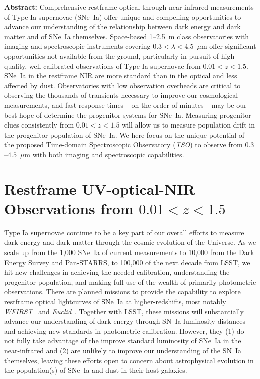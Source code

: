\documentclass[12pt,preprint]{aastex}
\newcommand{\snia}{SN~Ia\xspace}
\newcommand{\sneia}{SNe~Ia\xspace}
\begin{document}
\textbf{Abstract:}
    Comprehensive restframe optical through near-infrared measurements of Type Ia supernovae (\sneia) offer unique and compelling opportunities to advance our understanding of the relationship between dark energy and dark matter and of \sneia themselves.
    Space-based 1--2.5~m class observatories with imaging and spectroscopic instruments covering $0.3<\lambda<4.5$~$\mu$m offer significant opportunities not available from the ground, particularly in pursuit of high-quality, well-calibrated observations of Type Ia supernovae from $0.01<z<1.5$.
    \sneia in the restframe NIR are more standard than in the optical and less affected by dust.
    Observatories with low observation overheads are critical to observing the thousands of transients necessary to improve our cosmological measurements, and fast response times -- on the order of minutes -- may be our best hope of determine the progenitor systems for \sneia.
    Measuring progenitor clues consistently from $0.01<z<1.5$ will allow us to measure population drift in the progenitor population of \sneia.
    We here focus on the unique potential of the proposed Time-domain Spectroscopic Observatory ({\it TSO}) to observe from $0.3$--$4.5$~$\mu$m with both imaging and spectroscopic capabilities.


\pagebreak
\setcounter{page}{1}
\section{Restframe UV-optical-NIR Observations from $0.01<z<1.5$}

Type Ia supernovae continue to be a key part of our overall efforts to measure dark energy and dark matter through the cosmic evolution of the Universe.  As we scale up from the 1,000 \sneia of current measurements to 10,000 from the Dark Energy Survey and Pan-STARRS, to 100,000 of the next decade from LSST, we hit new challenges in achieving the needed calibration, understanding the progenitor population, and making full use of the wealth of primarily photometric observations.  There are planned missions to provide the capability to explore restframe optical lightcurves of \sneia at higher-redshifts, most notably {\it WFIRST}~\citep{Spergel15,Hounsell18} and {\it Euclid}~\citep{Astier14}.  Together with LSST, these missions will substantially advance our understanding of dark energy through \snia luminosity distances and achieving new standards in photometric calibration.  However, they (1) do not fully take advantage of the improve standard luminosity of \sneia in the near-infrared and (2) are unlikely to improve our understanding of the \snia themselves, leaving these efforts open to concern about astrophysical evolution in the population(s) of \sneia and dust in their host galaxies.
\end{document}
